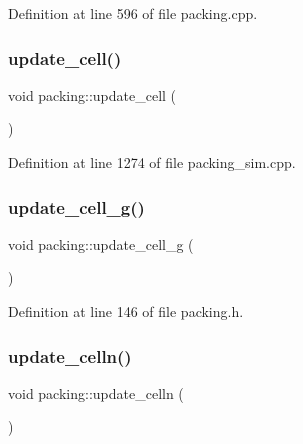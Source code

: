 Definition at line 596 of file packing.\+cpp.

\mbox{\label{classpacking_a944bd29a56c2811a991174ddb18aba63}} 
\subsubsection{\texorpdfstring{update\+\_\+cell()}{update\_cell()}}
{\footnotesize\ttfamily void packing\+::update\+\_\+cell (\begin{DoxyParamCaption}{ }\end{DoxyParamCaption})}



Definition at line 1274 of file packing\+\_\+sim.\+cpp.

\mbox{\label{classpacking_a7d0e7e1a244a3cb1080a5b8c189a3373}} 
\subsubsection{\texorpdfstring{update\+\_\+cell\+\_\+g()}{update\_cell\_g()}}
{\footnotesize\ttfamily void packing\+::update\+\_\+cell\+\_\+g (\begin{DoxyParamCaption}{ }\end{DoxyParamCaption})\hspace{0.3cm}{\ttfamily [inline]}}



Definition at line 146 of file packing.\+h.

\mbox{\label{classpacking_ac55b5f684a8767d536c671f23eea808e}} 
\subsubsection{\texorpdfstring{update\+\_\+celln()}{update\_celln()}}
{\footnotesize\ttfamily void packing\+::update\+\_\+celln (\begin{DoxyParamCaption}{ }\end{DoxyParamCaption})}




